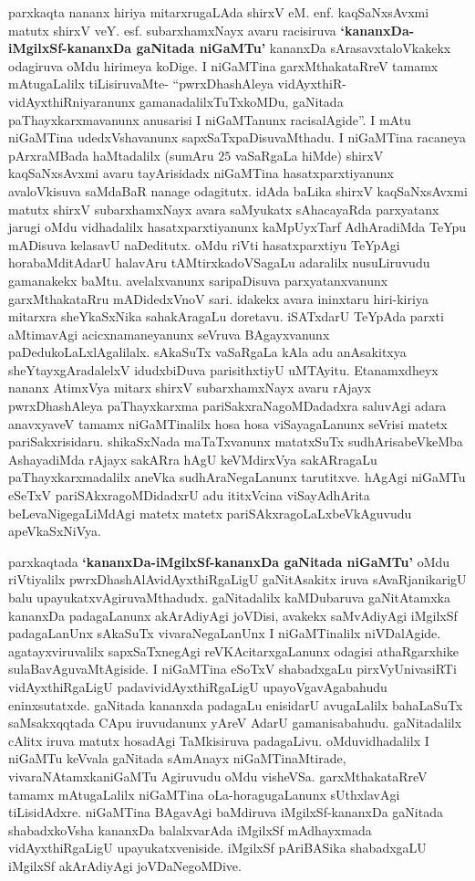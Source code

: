 parxkaqta nananx hiriya mitarxrugaLAda shirxV eM. enf. kaqSaNxsAvxmi matutx shirxV veY. esf. subarxhamxNayx avaru racisiruva {\bf `kananxDa-iMgilxSf-kananxDa gaNitada niGaMTu'} kananxDa sArasavxtaloVkakekx odagiruva oMdu hirimeya koDige. I niGaMTina garxMthakataRreV tamamx mAtugaLalilx tiLisiruvaMte- ``pwrxDhashAleya vidAyxthiR-vidAyxthiRniyaranunx gamanadalilxTuTxkoMDu, gaNitada paThayxkarxmavanunx anusarisi I niGaMTanunx racisalAgide''. I mAtu niGaMTina udedxVshavanunx sapxSaTxpaDisuvaMthadu. I niGaMTina racaneya pArxraMBada haMtadalilx (sumAru $25$ vaSaRgaLa hiMde) shirxV kaqSaNxsAvxmi avaru tayArisidadx niGaMTina hasatxparxtiyanunx avaloVkisuva saMdaBaR nanage odagitutx. idAda baLika shirxV kaqSaNxsAvxmi matutx shirxV subarxhamxNayx avara saMyukatx sAhacayaRda parxyatanx jarugi oMdu vidhadalilx hasatxparxtiyanunx kaMpUyxTarf AdhAradiMda TeYpu mADisuva kelasavU naDeditutx. oMdu riVti hasatxparxtiyu TeYpAgi horabaMditAdarU halavAru tAMtirxkadoVSagaLu adaralilx nusuLiruvudu gamanakekx baMtu. avelalxvanunx saripaDisuva parxyatanxvanunx garxMthakataRru mADidedxVnoV sari. idakekx avara ininxtaru hiri-kiriya mitarxra sheYkaSxNika sahakAragaLu doretavu. iSATxdarU TeYpAda parxti aMtimavAgi acicxnamaneyanunx seVruva BAgayxvanunx paDedukoLaLxlAgalilalx. sAkaSuTx vaSaRgaLa kAla adu anAsakitxya sheYtayxgAradalelxV idudxbiDuva parisithxtiyU uMTAyitu. Etanamxdheyx nananx AtimxVya mitarx shirxV subarxhamxNayx avaru rAjayx pwrxDhashAleya paThayxkarxma pariSakxraNagoMDadadxra saluvAgi adara anavxyaveV tamamx niGaMTinalilx hosa hosa viSayagaLanunx seVrisi matetx pariSakxrisidaru. shikaSxNada maTaTxvanunx matatxSuTx sudhArisabeVkeMba AshayadiMda rAjayx sakARra hAgU keVMdirxVya sakARragaLu paThayxkarxmadalilx aneVka sudhAraNegaLanunx tarutitxve. hAgAgi niGaMTu eSeTxV pariSAkxragoMDidadxrU adu ititxVcina viSayAdhArita beLevaNigegaLiMdAgi matetx matetx pariSAkxragoLaLxbeVkAguvudu apeVkaSxNiVya.

parxkaqtada {\bf `kananxDa-iMgilxSf-kananxDa gaNitada niGaMTu'} oMdu riVtiyalilx pwrxDhashAlA\-vidAyxthiRgaLigU gaNitAsakitx iruva sAvaRjanikarigU balu upayukatxvAgiru\-vaMthadudx. gaNitadalilx kaMDubaruva gaNitAtamxka kananxDa padagaLanunx akArAdiyAgi joVDisi, avakekx saMvAdiyAgi iMgilxSf padagaLanUnx sAkaSuTx vivaraNegaLanUnx I niGaMTinalilx niVDa\-lAgide. agatayxviruvalilx sapxSaTxnegAgi reVKAcitarxgaLanunx odagisi athaRgarxhike sulaBa\-vAgu\break\-vaMtAgiside. I niGaMTina eSoTxV shabadxgaLu pirxVyUnivasiRTi vidAyxthiRgaLigU \hbox{padavi}\break vidAyxthiRgaLigU upayoVgavAgabahudu eninxsutatxde. gaNitada kananxda padagaLu enisi\-darU avugaLalilx bahaLaSuTx saMsakxqqtada CApu iruvudanunx yAreV AdarU gamanisa\-bahudu. gaNitadalilx cAlitx iruva matutx hosadAgi TaMkisiruva padagaLivu. oMdu\break vidhadalilx I niGaMTu keVvala gaNitada sAmAnayx niGaMTinaMtirade, vivaraNAtamxka\break niGaMTu Agiruvudu oMdu visheVSa. garxMthakataRreV tamamx mAtugaLalilx niGaMTina oLa-horagu\-gaLanunx sUthxlavAgi tiLisidAdxre. niGaMTina BAgavAgi baMdiruva iMgilxSf-\-kananxDa gaNitada shabadxkoVsha kananxDa balalxvarAda iMgilxSf mAdhayxmada vidAyxthiRgaLigU upayukatxveniside. iMgilxSf pAriBASika shabadxgaLU iMgilxSf akArAdiyAgi joVDaNe\-goMDive.

